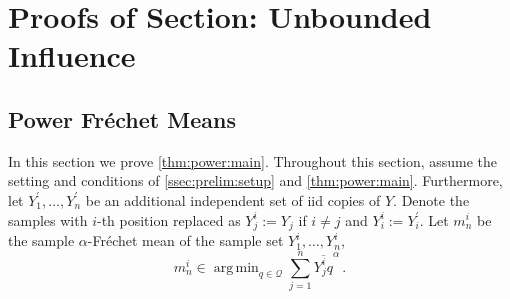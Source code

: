 \documentclass{article}
\newcommand*{\mc}[1]{\mathcal{#1}}
\newcommand{\pr}{^\prime}
\newcommand{\eqfs}{\,.}
\DeclareMathOperator*{\argmin}{arg\,min}
\newcommand{\ol}[2]{\overline{#1#2}}
\begin{document}
\section{Proofs of Section: Unbounded Influence}


\subsection{Power Fr\'echet Means}\label{sec:powerproof}
%
In this section we prove \cref{thm:power:main}. Throughout this section, assume the setting and conditions of \cref{ssec:prelim:setup} and \cref{thm:power:main}. Furthermore, let $Y_1\pr, \dots, Y_n\pr$ be an additional independent set of iid copies of $Y$.
Denote the samples with $i$-th position replaced as $Y_j^i := Y_j$ if $i \neq j$ and $Y_i^i := Y_i\pr$.
Let $m_n^i$ be the sample $\alpha$-Fr\'echet mean of the sample set $Y_1^i, \dots, Y_n^i$, 
\begin{equation}
    m_n^i \in \argmin_{q\in\mc Q} \sum_{j=1}^n \ol {Y_j^i}q^\alpha
    \eqfs
\end{equation}
\end{document}
